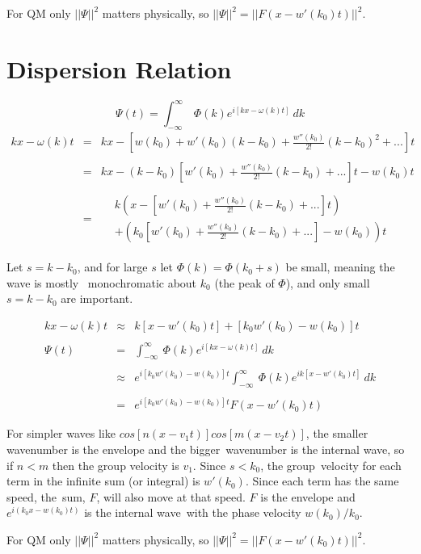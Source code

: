\documentclass[12pt]{article}
\begin{document}
    For QM only $||\Psi||^2$ matters physically, so $||\Psi||^2 = ||F(x- w'(k_0)t)||^2$.

\newpage
	\section*{Dispersion Relation}
	\bigskip\bigskip
	\boldmath $$\Psi(t) = \int_{-\infty}^{\infty} \ \Phi(k) e^{i[kx-\omega(k) t]} \ dk$$ \unboldmath
    \begin{eqnarray*}
        kx-\omega(k) t &=& kx - \left[ w(k_0) + w'(k_0)(k-k_0) + \frac{w''(k_0)}{2!}(k-k_0)^2 + ... \right]t \\ \\
        &=& kx - (k-k_0) \left[ w'(k_0) + \frac{w''(k_0)}{2!}(k-k_0) + ... \right]t - w(k_0) t \\ \\
        &=& \begin{aligned}
			&k \left( x - \left[ w'(k_0) + \frac{w''(k_0)}{2!}(k-k_0) + ... \right]t \right) \\[5pt]
			&+ \left( k_0 \left[ w'(k_0) + \frac{w''(k_0)}{2!}(k-k_0) + ... \right]- w(k_0) \right) t
		\end{aligned}
    \end{eqnarray*}

    Let $s = k-k_0$, and for large $s$ let $\Phi(k)=\Phi(k_0+s)$ be small, meaning the wave is mostly \
    monochromatic about $k_0$ (the peak of $\Phi$), and only small $s=k-k_0$ are important.
    
    \begin{eqnarray*}
        kx-\omega(k) t &\approx& k \left[ x - w'(k_0) t \right] + \left[ k_0 w'(k_0) - w(k_0) \right] t \\ \\
        \Psi(t) &=& \int_{-\infty}^{\infty} \ \Phi(k) e^{i[kx-\omega(k)t]} \ dk \\ \\
        &\approx& e^{i [ k_0 w'(k_0) - w(k_0) ] t}\int_{-\infty}^{\infty} \ \Phi(k) e^{i k [x- w'(k_0)t]} \ dk \\ \\
        &=& e^{i [ k_0 w'(k_0) - w(k_0) ] t} F(x- w'(k_0)t)
    \end{eqnarray*}
    
    For simpler waves like $cos[n(x-v_1t)]cos[m(x-v_2t)]$, the smaller wavenumber is the envelope and the bigger\
    wavenumber is the internal wave, so if $n < m$ then the group velocity is $v_1$. Since $s < k_0$, the group\ 
    velocity for each term in the infinite sum (or integral) is $w'(k_0)$. Since each term has the same speed, the\
    sum, $F$, will also move at that speed. $F$ is the envelope and $e^{i(k_0x - w(k_0)t)}$ is the internal wave\ 
    with the phase velocity $w(k_0)/k_0$.

    For QM only $||\Psi||^2$ matters physically, so $||\Psi||^2 = ||F(x- w'(k_0)t)||^2$.
\end{document}
